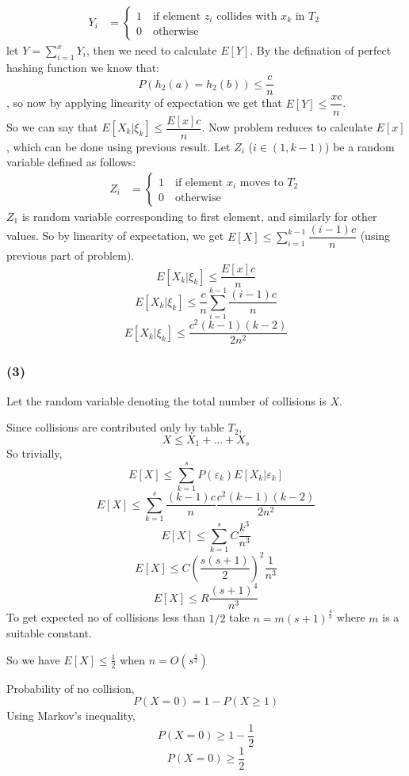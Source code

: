 \documentclass[a4paper]{article}
\begin{document}
\begin{align*}
Y_i & = \begin{cases} 
        1 \quad \text{if element $z_i$ collides with $x_k$ in $T_2$} \\
        0 \quad \text{otherwise}
\end{cases}
\end{align*}
let $Y = \sum_{i=1}^{x}Y_i$, then we need to calculate $E[Y]$. By the defination of perfect hashing function we know that:
$$P(h_2(a) = h_2(b)) \leq \frac{c}{n}$$, so now by applying linearity of expectation we get that $E[Y] \leq \dfrac{xc}{n}$.\\
So we can say that $E[X_k |\xi_{k}] \leq \dfrac{E[x]c}{n}$. Now problem reduces to calculate $E[x]$, which can be done using previous result. Let $Z_i$ ($i \in (1,k-1)$) be a random variable defined as follows:
\begin{align*}
Z_i & = \begin{cases} 
        1 \quad \text{if element $x_i$ moves to $T_2$} \\
        0 \quad \text{otherwise}
\end{cases}
\end{align*}
$Z_1$ is random variable corresponding to first element, and similarly for other values. So by linearity of expectation, we get $E[X] \leq \sum_{i=1}^{k-1} \dfrac{(i-1)c}{n}$ (using previous part of problem). 
$$E[X_k |\xi_{k}] \leq \dfrac{E[x]c}{n}$$
$$E[X_k |\xi_{k}] \leq \dfrac{c}{n}\sum_{i=1}^{k-1} \dfrac{(i-1)c}{n}$$
$$E[X_k |\xi_{k}] \leq \dfrac{c^2(k-1)(k-2)}{2n^2}$$

\subsubsection*{(3)}
Let the random variable denoting the total number of collisions is $X$.

Since collisions are contributed only by table $T_2$,
$$X \leq X_1 + ... + X_s$$
So trivially,
$$E[X] \leq \sum_{k=1}^{s}P(\varepsilon_k)E[X_k|\varepsilon_k]$$
$$E[X] \leq \sum_{k=1}^{s}\frac{(k-1)c}{n}\dfrac{c^2(k-1)(k-2)}{2n^2}$$
$$E[X] \leq \sum_{k=1}^{s}C\frac{k^3}{n^3}$$
$$E[X] \leq C\left(\frac{s(s+1)}{2}\right)^2\frac{1}{n^3}$$
$$E[X] \leq R\frac{(s+1)^4}{n^3}$$
To get expected no of collisions less than $1/2$ take $n = m(s+1)^{\frac{4}{3}}$ where $m$ is a suitable constant.

So we have $E[X] \leq \frac{1}{2}$ when $n = O(s^{\frac{4}{3}})$

Probability of no collision, $$P(X = 0) = 1 - P(X \geq 1)$$
Using Markov's inequality,
$$P(X = 0) \geq 1 - \frac{1}{2}$$
$$P(X = 0) \geq \frac{1}{2}$$
\end{document}
